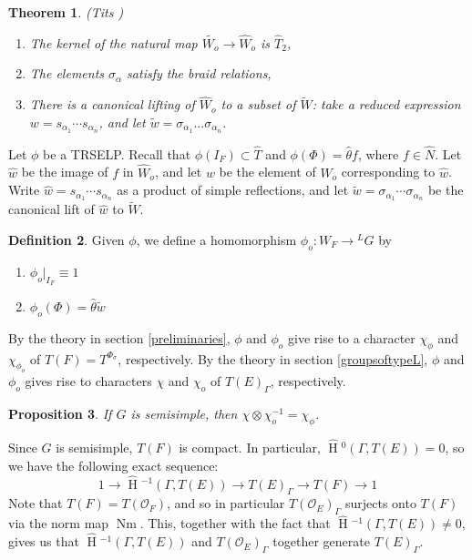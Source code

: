 \documentclass[11pt]{amsart}
\theoremstyle{plain}
\newtheorem{theorem}{Theorem}[section]
\newtheorem{proposition}[theorem]{Proposition}
\newcommand{\HT}[1]{\hat{\HH}{}^{#1}}
\theoremstyle{definition}
\newtheorem{definition}[theorem]{Definition}
\DeclareMathOperator{\HH}{H}
\DeclareMathOperator{\Nm}{Nm}
\begin{document}
\begin{theorem}{(Tits \cite{tits})}
\begin{enumerate}

\item The kernel of the natural map $\widetilde{W_o} \rightarrow \hat{W}_o$
  is $\hat{T}_2$,
\item The elements $\sigma_{\alpha}$ satisfy the braid relations,
\item There is a canonical lifting of $\hat{W}_o$ to a subset of
  $\widetilde{W}$: take a reduced expression $w = s_{\alpha_1} \cdots s_{\alpha_n}$,
  and let $\tilde{w} = \sigma_{\alpha_1} ... \sigma_{\alpha_n}$.
\end{enumerate}
\end{theorem}

Let $\phi$ be a TRSELP.  Recall that $\phi(I_F) \subset \hat{T}$ and
$\phi(\Phi) = \hat{\theta} f$, where $f \in \hat{N}$.  Let $\hat{w}$
be the image of $f$ in $\hat{W}_o$, and let $w$ be the element of
$W_o$ corresponding to $\hat{w}$.  Write $\hat{w} = s_{\alpha_1} \cdots s_{\alpha_n}$
as a product of simple reflections, and let
$\tilde{w} = \sigma_{\alpha_1} \cdots \sigma_{\alpha_n}$ be the
canonical lift of $\hat{w}$ to $\widetilde{W}$.

\begin{definition}
Given $\phi$, we define a homomorphism $\phi_o : W_F \rightarrow {}^L G$ by
\begin{enumerate}
\item $\phi_o|_{I_F} \equiv 1$
\item $\phi_o(\Phi) = \hat{\theta} \tilde{w}$
\end{enumerate}
\end{definition}

By the theory in section \ref{preliminaries}, $\phi$ and $\phi_o$ give
rise to a character $\chi_{\phi}$ and $\chi_{\phi_o}$ of
$T(F) = T^{\Phi_{\sigma}}$, respectively.  By the theory in section
\ref{groupsoftypeL}, $\phi$ and $\phi_o$ gives rise to characters
$\chi$ and $\chi_o$ of $T(E)_{\Gamma}$, respectively.

\begin{proposition}
If $G$ is semisimple, then $\chi \otimes \chi_o^{-1} = \chi_{\phi}$.
\end{proposition}

\proof
Since $G$ is semisimple, $T(F)$ is compact.  In particular,
$\HT{0}(\Gamma, T(E)) = 0$, so we have the following exact
sequence:
$$1 \rightarrow \HT{-1}(\Gamma, T(E)) \rightarrow T(E)_{\Gamma} \rightarrow T(F) \rightarrow 1$$
Note that $T(F) = T(\mathcal{O}_F)$, and so in particular
$T(\mathcal{O}_E)_{\Gamma}$ surjects onto $T(F)$ via the norm map
$\Nm$.  This, together with the fact that $\HT{-1}(\Gamma, T(E)) \neq 0$,
gives us that $\HT{-1}(\Gamma,T(E))$ and
$T(\mathcal{O}_E)_{\Gamma}$ together generate $T(E)_{\Gamma}$.
\end{document}
